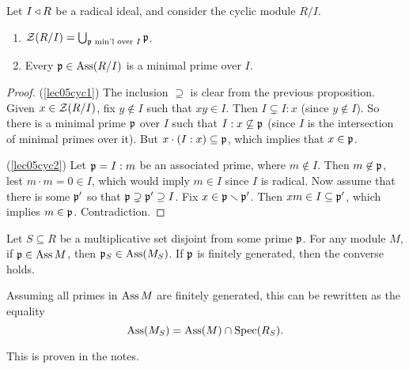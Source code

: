 \begin{theorem}\label{lec05radNOembedded}
   Let $I\triangleleft R$ be a radical ideal, and consider the cyclic module $R/I$.
   \begin{enumerate}
     \item \label{lec05cyc1} $\mathcal{Z}(R/I) = \bigcup_{\mathfrak{p}\text{ min'l over } I} \mathfrak{p}$.
     \item \label{lec05cyc2} Every $\mathfrak{p}\in \operatorname{Ass} (R/I)$ is a minimal prime over $I$.
   \end{enumerate}
 \end{theorem}
 \begin{proof}
   (\ref{lec05cyc1}) The inclusion $\supseteq$ is clear from the previous proposition.
   Given $x\in \mathcal{Z}(R/I)$, fix $y\not\in I$ such that $xy\in I$. Then $I\subsetneq I:x$
   (since $y\not\in I$). So there is a minimal prime $\mathfrak{p}$ over $I$ such that
   $I:x\not\subseteq \mathfrak{p}$ (since $I$ is the intersection of minimal primes over it). But
   $x\cdot (I:x)\subseteq \mathfrak{p}$, which implies that $x\in \mathfrak{p}$.

   (\ref{lec05cyc2}) Let $\mathfrak{p}=I:m$ be an associated prime, where $m\not\in I$. Then
   $m\not\in \mathfrak{p}$, lest $m\cdot m=0\in I$, which would imply $m\in I$ since $I$ is
   radical. Now assume that there  is some $\mathfrak{p}'$ so that $\mathfrak{p}\supsetneq \mathfrak{p}'\supseteq I$.
   Fix $x\in \mathfrak{p}\smallsetminus \mathfrak{p}'$. Then $xm\in I\subseteq \mathfrak{p}'$, which implies $m\in \mathfrak{p}$.
   Contradiction.
 \end{proof}

 \begin{proposition}
   Let $S\subseteq R$ be a multiplicative set disjoint from some prime $\mathfrak{p}$. For any
   module $M$, if $\mathfrak{p}\in \operatorname{Ass} M$, then $\mathfrak{p}_S\in \operatorname{Ass} (M_S)$. If $\mathfrak{p}$ is finitely
   generated, then the converse holds.
 \end{proposition}
 Assuming all primes in $\operatorname{Ass} M$ are finitely generated, this can be rewritten as the
 equality
 \[
    \operatorname{Ass} (M_S) = \operatorname{Ass}(M) \cap \operatorname{Spec} (R_S).
 \]

 This is proven in the notes. \anton{}
